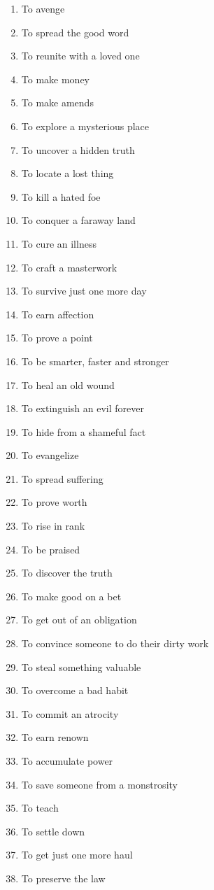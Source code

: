 \begin{enumerate}
\item To avenge
\item To spread the good word
\item To reunite with a loved one
\item To make money
\item To make amends
\item To explore a mysterious place
\item To uncover a hidden truth
\item To locate a lost thing
\item To kill a hated foe
\item To conquer a faraway land
\item To cure an illness
\item To craft a masterwork
\item To survive just one more day
\item To earn affection
\item To prove a point
\item To be smarter, faster and stronger
\item To heal an old wound
\item To extinguish an evil forever
\item To hide from a shameful fact
\item To evangelize
\item To spread suffering
\item To prove worth
\item To rise in rank
\item To be praised
\item To discover the truth
\item To make good on a bet
\item To get out of an obligation
\item To convince someone to do their dirty work
\item To steal something valuable
\item To overcome a bad habit
\item To commit an atrocity
\item To earn renown
\item To accumulate power
\item To save someone from a monstrosity
\item To teach
\item To settle down
\item To get just one more haul
\item To preserve the law

\end{enumerate}
